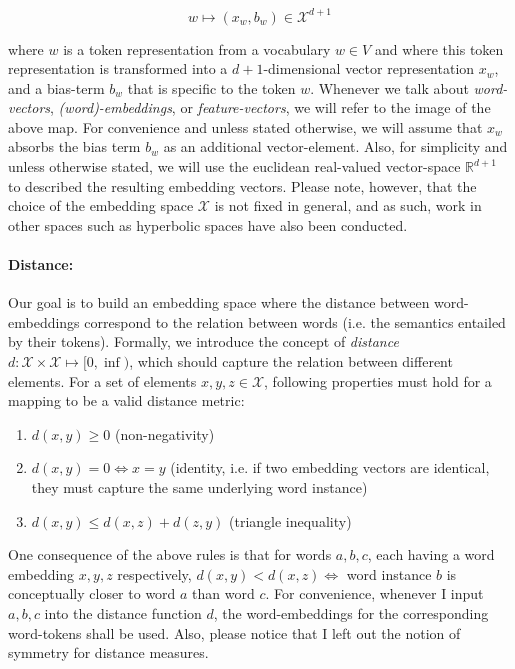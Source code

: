 \documentclass[a4paper,12pt,twoside,openright]{report}
\begin{document}
\begin{equation}
\label{map:embedding_mapping}
w \mapsto (x_w, b_w) \in \mathcal{X}^{d + 1}
\end{equation}

where $w$ is a token representation from a vocabulary $w \in V$ and where this token representation is transformed into a $d+1$-dimensional vector representation $x_w$, and a bias-term $b_w$ that is specific to the token $w$.
Whenever we talk about \textit{word-vectors}, \textit{(word)-embeddings}, or \textit{feature-vectors}, we will refer to the image of the above map. 
For convenience and unless stated otherwise, we will assume that $x_w$ absorbs the bias term $b_w$ as an additional vector-element.
Also, for simplicity and unless otherwise stated, we will use the euclidean real-valued vector-space $\mathbb{R}^{d+1}$ to described the resulting embedding vectors.
Please note, however, that the choice of the embedding space $\mathcal{X}$ is not fixed in general, and as such, work in other spaces such as hyperbolic spaces  \cite{ganea18} have also been conducted. 

\paragraph{Distance:} Our goal is to build an embedding space where the distance between word-embeddings correspond to the relation between words (i.e. the semantics entailed by their tokens).
Formally, we introduce the concept of \textit{distance} $d : \mathcal{X}  \times \mathcal{X} \mapsto [ 0, \inf )$, which should capture the relation between different elements. 
For a set of elements $x, y, z \in \mathcal{X}$, following properties must hold for a mapping to be a valid distance metric:

\begin{enumerate}
\item $d(x, y) \geq 0$ (non-negativity)
\item $d(x, y) = 0 \iff x = y$ (identity, i.e. if two embedding vectors are identical, they must capture the same underlying word instance)
\item $d(x, y) \leq d(x, z) + d(z, y)$ (triangle inequality)
\end{enumerate}{\label{def:distance}}

One consequence of the above rules is that for words $a, b, c$, each having a word embedding $x, y, z$ respectively, $d(x, y) < d(x, z) \iff $ word instance $b$ is conceptually closer to word $a$ than word $c$.
For convenience, whenever I input $a, b, c$ into the distance function $d$, the word-embeddings for the corresponding word-tokens shall be used.
Also, please notice that I left out the notion of symmetry for distance measures.
\end{document}
